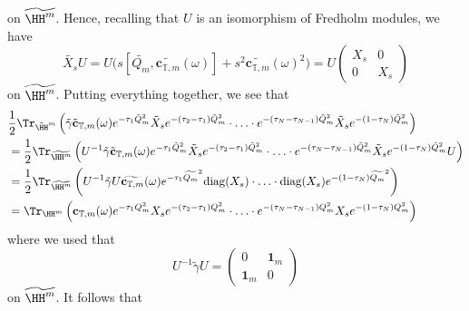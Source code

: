 \documentclass[a4paper, english, 12pt, bibliography=totocnumbered,
index=totoc]{scrartcl}
\begin{document}
on $\widetilde{\HH^m}$.
Hence, recalling that $U$ is an isomorphism of Fredholm modules, we have
\begin{equation*}
	\tilde{X_s}U = U\big(s[\widetilde{Q_m},
	\widetilde{\mathbf{c}_{\mathbb{T}, m}}(\omega)]
	+ s^2 \widetilde{\mathbf{c}_{\mathbb{T}, m}}(\omega)^2 \big) = U
	\begin{pmatrix}
		X_s & 0 \\
		0 & X_s
	\end{pmatrix}
\end{equation*}
on $\widetilde{\HH^m}$.
Putting everything together, we see that
\begin{align*}
	& \frac 12 \Tr_{\tilde{\HH}^m}\left(\tilde{\gamma}
	\tilde{\mathbf{c}}_{\mathbb{T},
		m}(\omega)e^{-\tau_1\tilde{Q}_{m}^2}\tilde{X}_{s}e^{-(\tau_2
		- \tau_1)\tilde{Q}_{m}^2} \cdot \ldots \cdot e^{-(\tau_{N} -
		\tau_{N-1})\tilde{Q}_{m}^2}\tilde{X}_{s}
	e^{-(1-\tau_{N})\tilde{Q}_{m}^2}
	\right) \\
	& = \frac 12 \Tr_{\widetilde{\HH^m}}\left(U^{-1}\tilde{\gamma}
	\tilde{\mathbf{c}}_{\mathbb{T},
		m}(\omega)e^{-\tau_1\tilde{Q}_{m}^2}\tilde{X}_{s}e^{-(\tau_2
		- \tau_1)\tilde{Q}_{m}^2} \cdot \ldots \cdot e^{-(\tau_{N} -
		\tau_{N-1})\tilde{Q}_{m}^2}\tilde{X}_{s}
	e^{-(1-\tau_{N})\tilde{Q}_{m}^2}
	U\right) \\
	& = \frac 12 \Tr_{\widetilde{\HH^m}}\left(U^{-1}\tilde{\gamma}U
	\widetilde{\mathbf{c}_{\mathbb{T},
			m}}(\omega)e^{-\tau_1\widetilde{Q_m}^2}\mathrm{diag}(X_s) \cdot
	\ldots
	\cdot\mathrm{diag}(X_s)
	e^{-(1-\tau_{N})\widetilde{Q_m}^2}
	\right) \\
	& = \Tr_{\HH^m}\left(\mathbf{c}_{\mathbb{T}, m}(\omega)e^{-\tau_1
		Q_{m}^2}X_{s}e^{-(\tau_2
		- \tau_1) Q_{m}^2} \cdot \ldots \cdot e^{-(\tau_{N} -
		\tau_{N-1}) Q_{m}^2}X_{s}
	e^{-(1-\tau_{N}) Q_{m}^2}
	\right)
\end{align*}
where we used that
\begin{equation*}
	U^{-1} \tilde{\gamma} U =
	\begin{pmatrix}
		0 & \mathbf{1}_m \\
		\mathbf{1}_m & 0
	\end{pmatrix}
\end{equation*}
on $\widetilde{\HH^m}$.
It follows that
\end{document}
